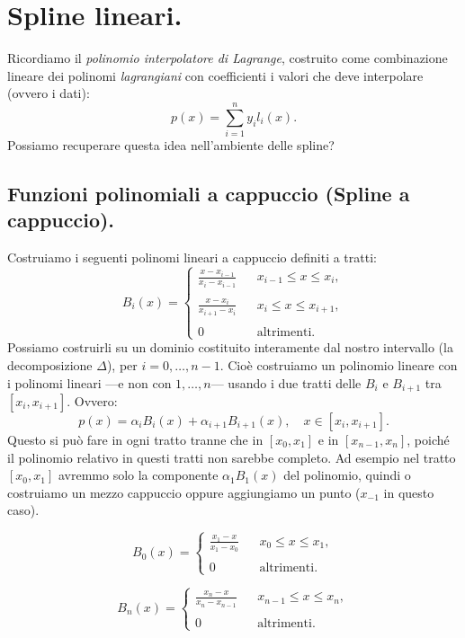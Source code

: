 \section{Spline lineari.}
Ricordiamo il \emph{polinomio interpolatore di Lagrange}, costruito come
combinazione lineare dei polinomi \emph{lagrangiani} con coefficienti i valori
che deve interpolare (ovvero i dati):
\[
p(x) = \sum_{i=1}^n y_il_i(x).
\]
Possiamo recuperare questa idea nell'ambiente delle spline?

\subsection{Funzioni polinomiali a cappuccio (Spline a cappuccio).}
Costruiamo i seguenti polinomi lineari a cappuccio definiti a tratti:
\[
B_i(x) = \left\{
\begin{array}{llr}
\frac{x -x_{i-1}}{x_i- x_{i-1}} & &x_{i-1} \leq x \leq x_i, \\
\\
\frac{x -x_{i}}{x_{i+1} -x_{i}} & &x_{i} \leq x \leq x_{i+1}, \\
\\
0 & &\textrm{altrimenti.}
\end{array}
\right.
\]
Possiamo costruirli su un dominio costituito interamente dal nostro intervallo
(la decomposizione $\Delta$), per $i = 0, \ldots, n-1$. Cioè costruiamo un
polinomio lineare con i polinomi lineari ---e non con $1, \ldots, n$--- 
usando i due tratti delle $B_i$ e $B_{i+1}$ tra $[x_i,x_{i+1}]$. Ovvero:
\[
p(x) = \alpha_iB_i(x) + \alpha_{i+1}B_{i+1}(x), \quad x \in [x_i, x_{i+1}].
\]
Questo si può fare in ogni tratto tranne che in $[x_0, x_1]$ e in 
$[x_{n-1}, x_n]$, poiché il polinomio relativo in questi tratti non sarebbe 
completo. Ad esempio nel tratto $[x_0, x_1]$ avremmo solo la componente
$\alpha_1B_1(x)$ del polinomio, quindi o costruiamo un mezzo cappuccio oppure
aggiungiamo un punto ($x_{-1}$ in questo caso).

\[
B_0(x) = \left\{
\begin{array}{llr}
\frac{x_1 -x}{x_1 -x_0} & &x_0 \leq x \leq x_1, \\
\\
0 & &\textrm{altrimenti.}
\end{array}
\right.\]

\[
B_n(x) = \left\{
\begin{array}{llr}
\frac{x_n -x}{x_n -x_{n-1}} & &x_{n-1} \leq x \leq x_n, \\
\\
0 & &\textrm{altrimenti.}
\end{array}
\right.\]


